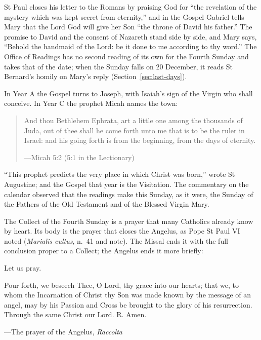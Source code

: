 \noindent St Paul closes his letter to the Romans by praising God for ``the
revelation of the mystery which was kept secret from eternity,'' and in the
Gospel Gabriel tells Mary that the Lord God will give her Son ``the throne of
David his father.'' The promise to David and the consent of Nazareth stand side
by side, and Mary says, ``Behold the handmaid of the Lord: be it done to me
according to thy word.'' The Office of Readings has no second reading of its
own for the Fourth Sunday and takes that of the date; when the Sunday falls on
20 December, it reads St Bernard's homily on Mary's reply
(Section~\ref{sec:last-days}).

In Year A the Gospel turns to Joseph, with Isaiah's sign of the Virgin who shall
conceive. In Year C the prophet Micah names the town:

\begin{quote}
And thou Bethlehem Ephrata, art a little one among the thousands of Juda, out of
thee shall he come forth unto me that is to be the ruler in Israel: and his going
forth is from the beginning, from the days of eternity.\par
{\smallskip\noindent\small ---Micah 5:2 (5:1 in the Lectionary)\par}
\end{quote}

\noindent ``This prophet predicts the very place in which Christ was born,'' wrote
St Augustine; and the Gospel that year is the Visitation. The commentary on the
calendar observed that the readings make this
Sunday, as it were, the Sunday of the Fathers of the Old Testament and of the
Blessed Virgin Mary.

The Collect of the Fourth Sunday is a prayer that many Catholics already know by
heart. Its body is the prayer that closes the Angelus, as Pope St Paul VI
noted (\emph{Marialis cultus}, n.~41 and note). The Missal ends it with the
full conclusion proper to a Collect; the Angelus ends it more briefly:

\medskip
\noindent {}\par
\noindent {}\par

\medskip

\noindent Let us pray.\par
\noindent Pour forth, we beseech Thee, O Lord, thy grace into our hearts; that we, to whom the Incarnation of Christ thy Son was made known by the message of an angel, may by his Passion and Cross be brought to the glory of his resurrection. Through the same Christ our Lord. R. Amen.\par
{\smallskip\noindent\small ---The prayer of the Angelus, \emph{Raccolta}\par}
\medskip

